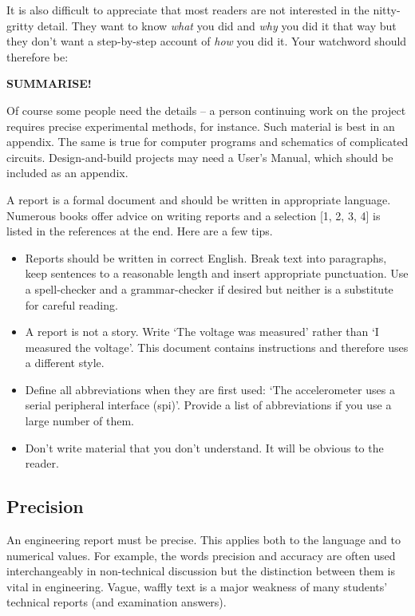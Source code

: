 It is also difficult to appreciate that most readers are not interested in the
nitty-gritty detail. They want to know \textit{what} you did and \textit{why}
you did it that way but they don’t want a step-by-step account of \textit{how}
you did it. Your watchword should therefore be:

\begin{center}
    \large\textbf{SUMMARISE!}
\end{center}

Of course some people need the details {--} a person continuing work on the
project requires precise experimental methods, for instance. Such material is
best in an appendix. The same is true for computer programs and schematics of
complicated circuits. Design-and-build projects may need a User’s Manual, which
should be included as an appendix.

A report is a formal document and should be written in appropriate language.
Numerous books offer advice on writing reports and a selection [1, 2, 3, 4] is
listed in the references at the end. Here are a few tips.

\begin{itemize}
    \item Reports should be written in correct English. Break text into
          paragraphs, keep sentences to a reasonable length and insert
          appropriate punctuation. Use a spell-checker and a grammar-checker if
          desired but neither is a substitute for careful reading.
    \item A report is not a story. Write ‘The voltage was measured’ rather than
          ‘I measured the voltage’. This document contains instructions and
          therefore uses a different style.
    \item Define all abbreviations when they are first used: ‘The accelerometer
          uses a serial peripheral interface (\gls{spi})’. Provide a list of
          abbreviations if you use a large number of them.
    \item Don’t write material that you don’t understand. It will be obvious to
          the reader.
\end{itemize}

\subsection{Precision}

An engineering report must be precise. This applies both to the language and to
numerical values. For example, the words precision and accuracy are often used
interchangeably in non-technical discussion but the distinction between them is
vital in engineering. Vague, waffly text is a major weakness of many students’
technical reports (and examination answers).

